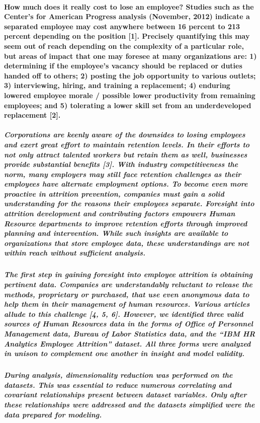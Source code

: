 \documentclass{article}
\begin{document}
\paragraph{How much does it really cost to lose an employee? Studies such as the Center’s for American Progress analysis (November, 2012) indicate a separated employee may cost anywhere between 16 percent to 213 percent depending on the position [1]. Precisely quantifying this may seem out of reach depending on the complexity of a particular role, but areas of impact that one may foresee at many organizations are: 1) determining if the employee’s vacancy should be replaced or duties handed off to others; 2) posting the job opportunity to various outlets; 3) interviewing, hiring, and training a replacement; 4) enduring lowered employee morale / possible lower productivity from remaining employees; and 5) tolerating a lower skill set from an underdeveloped replacement [2].}

\subparagraph{Corporations are keenly aware of the downsides to losing employees and exert great effort to maintain retention levels. In their efforts to not only attract talented workers but retain them as well, businesses provide substantial benefits [3]. With industry competitiveness the norm, many employers may still face retention challenges as their employees have alternate employment options. To become even more proactive in attrition prevention, companies must gain a solid understanding for the reasons their employees separate. Foresight into attrition development and contributing factors empowers Human Resource departments to improve retention efforts through improved planning and intervention. While such insights are available to organizations that store employee data, these understandings are not within reach without sufficient analysis.}

\subparagraph{The first step in gaining foresight into employee attrition is obtaining pertinent data. Companies are understandably reluctant to release the methods, proprietary or purchased, that use even anonymous data to help them in their management of human resources. Various articles allude to this challenge [4, 5, 6]. However, we identified three valid sources of Human Resources data in the forms of Office of Personnel Management data, Bureau of Labor Statistics data, and the “IBM HR Analytics Employee Attrition” dataset. All three forms were analyzed in unison to complement one another in insight and model validity.}

\subparagraph{During analysis, dimensionality reduction was performed on the datasets. This was essential to reduce numerous correlating and covariant relationships present between dataset variables. Only after these relationships were addressed and the datasets simplified were the data prepared for modeling.}
\end{document}
